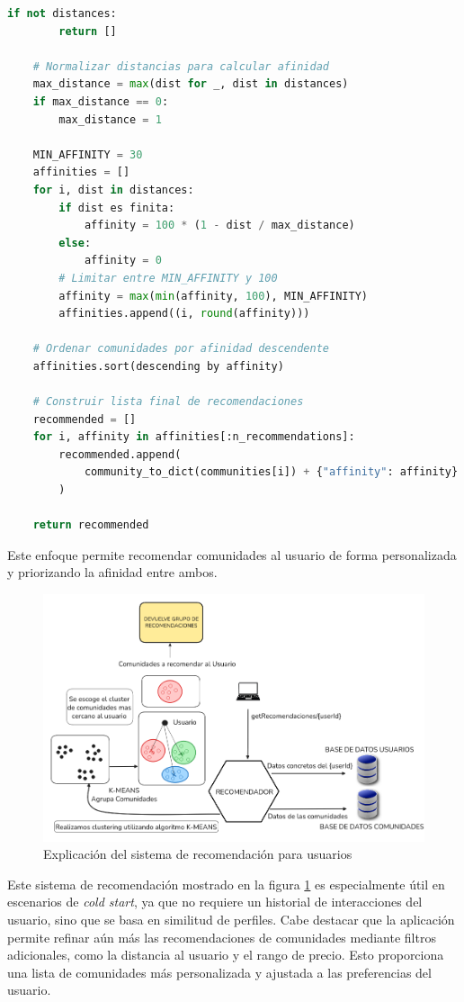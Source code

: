 \begin{lstlisting}[language=Python, caption={Pseudocódigo de la función recommend\_communities\_by\_user}]
    if not distances:
        return []

    # Normalizar distancias para calcular afinidad
    max_distance = max(dist for _, dist in distances)
    if max_distance == 0:
        max_distance = 1

    MIN_AFFINITY = 30
    affinities = []
    for i, dist in distances:
        if dist es finita:
            affinity = 100 * (1 - dist / max_distance)
        else:
            affinity = 0
        # Limitar entre MIN_AFFINITY y 100
        affinity = max(min(affinity, 100), MIN_AFFINITY)
        affinities.append((i, round(affinity)))

    # Ordenar comunidades por afinidad descendente
    affinities.sort(descending by affinity)

    # Construir lista final de recomendaciones
    recommended = []
    for i, affinity in affinities[:n_recommendations]:
        recommended.append(
            community_to_dict(communities[i]) + {"affinity": affinity}
        )

    return recommended
\end{lstlisting}



Este enfoque permite recomendar comunidades al usuario de forma personalizada y priorizando la afinidad entre ambos.

\begin{figure}[H]
  \centering
  \includegraphics[width=1\textwidth]{fotos/clustering.png}
  \caption{Explicación del sistema de recomendación para usuarios}
  \label{fig:clustering}
\end{figure}
Este sistema de recomendación mostrado en la figura \ref{fig:clustering} es especialmente útil en escenarios de \textit{cold start}, ya que no requiere un historial de interacciones del usuario, sino que se basa en similitud de perfiles.
Cabe destacar que la aplicación permite refinar aún más las recomendaciones de comunidades mediante filtros adicionales, como la distancia al usuario y el rango de precio. Esto proporciona una lista de comunidades más personalizada y ajustada a las preferencias del usuario.

